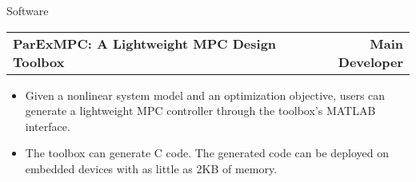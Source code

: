 \documentclass{resume} %
\makeatletter
\newcommand{\projectheader}[3]{%
  \begin{tabular*}{\linewidth}{@{}l@{\extracolsep{\fill}}l@{\extracolsep{\fill}}r@{}}
    \textbf{#1} & \textbf{#2} & \textbf{#3} \\
  \end{tabular*}%
  \vspace{0.5em} %
}
\makeatother
\begin{document}
\begin{rSection}{Software}
        \vspace{3mm}
        \projectheader{ParExMPC: A Lightweight MPC Design Toolbox}{}{Main Developer}
        \vspace{-7mm}

        \begin{minipage}[h]{0.99\textwidth} %
        \begin{itemize}
            \item Given a nonlinear system model and an optimization objective, users can generate a lightweight MPC controller through the toolbox's MATLAB interface. 
            \item The toolbox can generate C code. The generated code can be deployed on embedded devices with as little as 2KB of memory.
        \end{itemize}
        \end{minipage}

\end{rSection}
\end{document}
